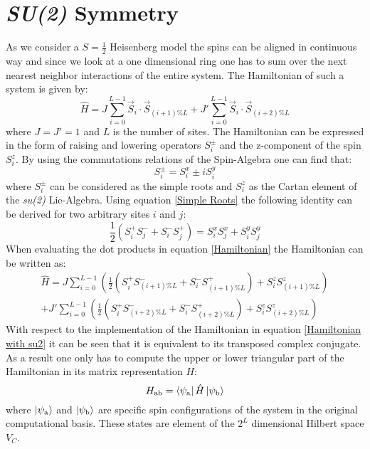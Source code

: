 \documentclass{scrartcl}
\begin{document}
\section{\textit{SU(2)} Symmetry}
As we consider a $S=\tfrac{1}{2}$ Heisenberg model the spins can be aligned in continuous way and since we look at a one dimensional ring one has to sum over the next nearest neighbor interactions of the entire system. The Hamiltonian of such a system is given by:
\begin{equation}
    \hat{H}=J\sum ^{L-1 }_{i=0} \Vec{S}_{i} \cdot \Vec{S}_{(i+1)\%L}+J'\sum ^{L-1 }_{i=0}  \Vec{S}_{i} \cdot\Vec{S}_{(i+2)\%L}
    \label{Hamiltonian}
\end{equation}
where $J=J'=1$ and $L$ is the number of sites. The Hamiltonian can be expressed in the form of raising and lowering operators $S^{\pm}_i$ and the z-component of the spin $S^z_i$. By using the commutations relations of the Spin-Algebra one can find that:
\begin{equation}
    S^{\pm}_i=S^{x}_i\pm i S^{y}_i
    \label{Simple Roots}
\end{equation}
where $S^{\pm}_i$ can be considered as the simple roots and $S^z_i$ as the Cartan element of the \textit{su(2)} Lie-Algebra. Using equation \ref{Simple Roots} the following identity can be derived for two arbitrary sites $i$ and $j$:
\begin{equation}
    \frac{1}{2}(S^{+}_i S^{-}_j + S^{-}_i S^{+}_j) = S^{x}_i S^{x}_j+S^{y}_i S^{y}_j
    \label{simple roots identity}
\end{equation}
When evaluating the dot products in equation \ref{Hamiltonian} the Hamiltonian can be written as:
\begin{equation} \begin{aligned}
    \hat{H}=J\sum ^{L-1 }_{i=0} \left( \frac{1}{2}(S^{+}_i S^{-}_{(i+1)\%L} + S^{-}_i S^{+}_{(i+1)\%L})+ S^z_i S^z_{(i+1)\%L} \right) \\
    +J'\sum ^{L-1 }_{i=0} \left( \frac{1}{2}(S^{+}_i S^{-}_{(i+2)\%L} + S^{-}_i S^{+}_{(i+2)\%L})+ S^z_i S^z_{(i+2)\%L} \right)
    \label{Hamiltonian with su2}
\end{aligned} \end{equation}
With respect to the implementation of the Hamiltonian in equation \ref{Hamiltonian with su2} it can be seen that it is equivalent to its transposed complex conjugate. As a result one only has to compute the upper or lower triangular part of the Hamiltonian in its matrix representation $H$:
\begin{equation*}
    H_{\mathrm{ab}}=\bra{\psi_\mathrm{a}} \hat{H} \ket{\psi_\mathrm{b}}
\end{equation*}
where $\ket{\psi_\mathrm{a}}$ and $\ket{\psi_\mathrm{b}}$ are specific spin configurations of the system in the original computational basis. These states are element of the $2^L$ dimensional Hilbert space $V_C$.
\end{document}
